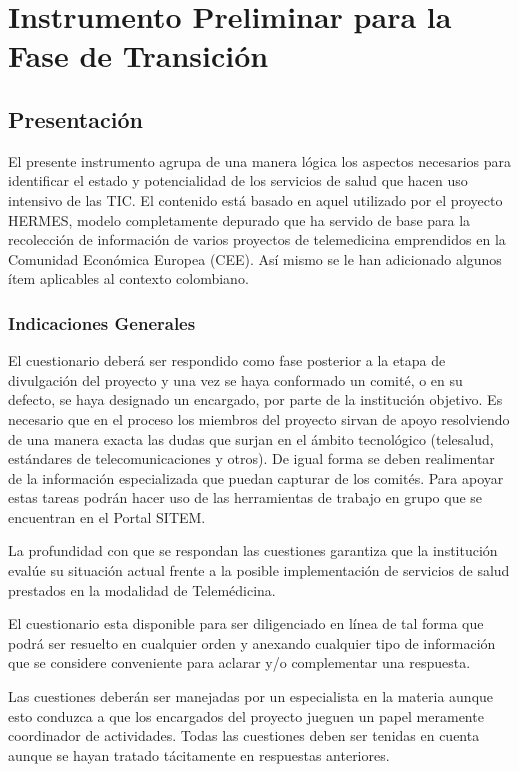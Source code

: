 \chapter{Instrumento Preliminar para la Fase de Transición}
\label{formulario_preliminar}

\section{Presentación}

El presente instrumento agrupa de una manera lógica los aspectos necesarios para identificar el estado y potencialidad de los servicios de salud que hacen uso intensivo de las TIC. El contenido está basado en aquel utilizado por el proyecto HERMES, modelo completamente depurado que ha servido de base para la recolección de información de varios proyectos de telemedicina emprendidos en la Comunidad Económica Europea (CEE). Así mismo se le han adicionado algunos ítem aplicables al contexto colombiano.

\subsection{Indicaciones Generales}

El cuestionario deberá ser respondido como fase posterior a la etapa de divulgación del proyecto y una vez se haya conformado un comité, o en su defecto, se haya designado un encargado, por parte de la institución objetivo. Es necesario que en el proceso los miembros del proyecto sirvan de apoyo resolviendo de una manera exacta las dudas que surjan en el ámbito tecnológico (telesalud, estándares de telecomunicaciones y otros). De igual forma se deben realimentar de la información especializada que puedan capturar de los comités. Para apoyar estas tareas podrán hacer uso de las herramientas de trabajo en grupo que se encuentran en el Portal SITEM.

La profundidad con que se respondan las cuestiones garantiza que la institución evalúe su situación actual frente a la posible implementación de servicios de salud prestados en la modalidad de Telemédicina.

El cuestionario esta disponible para ser diligenciado en línea de tal forma que podrá ser resuelto en cualquier orden y anexando cualquier tipo de información que se considere conveniente para aclarar y/o complementar una respuesta. 

Las cuestiones deberán ser manejadas por un especialista en la materia aunque esto conduzca a que los encargados del proyecto jueguen un papel meramente coordinador de actividades. Todas las cuestiones deben ser tenidas en cuenta aunque se hayan tratado tácitamente en respuestas anteriores.


